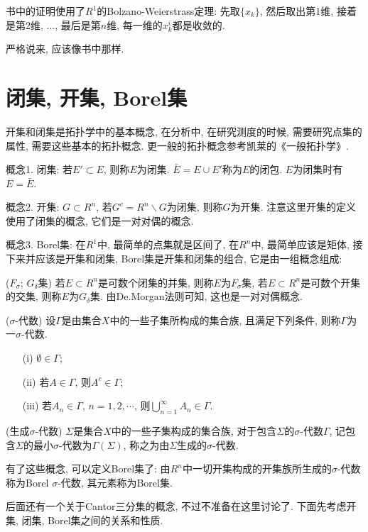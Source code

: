 \documentclass[12pt,a4paper,openany]{book}
\makeatletter
\def\wideubar{\underaccent{{\cc@style\underline{\mskip10mu}}}}
\def\Wideubar{\underaccent{{\cc@style\underline{\mskip8mu}}}}
\def\widebar{\accentset{{\cc@style\underline{\mskip10mu}}}}
\def\Widebar{\accentset{{\cc@style\underline{\mskip8mu}}}}
\makeatother
\begin{document}
书中的证明使用了$R^1$的Bolzano-Weierstrass定理: 先取$\{x_k\}$, 然后取出第1维, 接着是第2维, ..., 最后是第$n$维, 每一维的$x_k^i$都是收敛的.

严格说来, 应该像书中那样.



\section{闭集, 开集, Borel集}
开集和闭集是拓扑学中的基本概念, 在分析中, 在研究测度的时候, 需要研究点集的属性, 需要这些基本的拓扑概念. 更一般的拓扑概念参考凯莱的《一般拓扑学》.

概念1. 闭集: 若$E' \subset E$, 则称$E$为闭集. $\bar{E} = E \cup E'$称为$E$的闭包. $E$为闭集时有$E = \bar{E}$.

概念2. 开集: $G \subset R^n$, 若$G^c = R^n \backslash G$为闭集, 则称$G$为开集. 注意这里开集的定义使用了闭集的概念, 它们是一对对偶的概念.

概念3. Borel集: 在$R^1$中, 最简单的点集就是区间了, 在$R^n$中, 最简单应该是矩体, 接下来并应该是开集和闭集, Borel集是开集和闭集的组合, 它是由一组概念组成:

($F_{\sigma}$; $G_{\delta}$集) 若$E \subset R^n$是可数个闭集的并集, 则称$E$为$F_{\sigma}$集, 若$E \subset R^n$是可数个开集的交集, 则称$E$为$G_{\delta}$集. 由De.Morgan法则可知, 这也是一对对偶概念.

($\sigma$-代数) 设$\Gamma$是由集合$X$中的一些子集所构成的集合族, 且满足下列条件, 则称$\Gamma$为一$\sigma$-代数.
\begin{enumerate}
\item[(i)] $\emptyset \in \Gamma$;
\item[(ii)] 若$A \in \Gamma$, 则$A^c \in \Gamma$;
\item[(iii)]若$A_n \in \Gamma$, $n=1,2,\cdots$, 则$\bigcup\limits_{n=1}^{\infty}{A_n} \in \Gamma$.
\end{enumerate}

(生成$\sigma$-代数) $\Sigma$是集合$X$中的一些子集构成的集合族, 对于包含$\Sigma$的$\sigma$-代数$\Gamma$, 记包含$\Sigma$的最小$\sigma$-代数为$\Gamma(\Sigma)$, 称之为由$\Sigma$生成的$\sigma$-代数.

有了这些概念, 可以定义Borel集了: 由$R^n$中一切开集构成的开集族所生成的$\sigma$-代数称为Borel $\sigma$-代数, 其元素称为Borel集.

后面还有一个关于Cantor三分集的概念, 不过不准备在这里讨论了. 下面先考虑开集, 闭集, Borel集之间的关系和性质.
\end{document}
